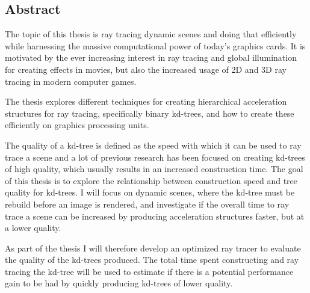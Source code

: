 
\begin{center}
\begin{minipage}{0.7\textwidth}
\vspace{6cm}

\section*{Abstract}

The topic of this thesis is ray tracing dynamic scenes and doing that
efficiently while harnessing the massive computational power of today's graphics
cards. It is motivated by the ever increasing interest in ray tracing and global
illumination for creating effects in movies, but also the increased usage of 2D
and 3D ray tracing in modern computer games.

The thesis explores different techniques for creating hierarchical acceleration
structures for ray tracing, specifically binary kd-trees, and how to create
these efficiently on graphics processing units.

The quality of a kd-tree is defined as the speed with which it can be used to
ray trace a scene and a lot of previous research has been focused on creating
kd-trees of high quality, which usually results in an increased construction
time. The goal of this thesis is to explore the relationship between
construction speed and tree quality for kd-trees. I will focus on dynamic
scenes, where the kd-tree must be rebuild before an image is rendered, and
investigate if the overall time to ray trace a scene can be increased by
producing acceleration structures faster, but at a lower quality.

As part of the thesis I will therefore develop an optimized ray tracer to
evaluate the quality of the kd-trees produced. The total time spent constructing
and ray tracing the kd-tree will be used to estimate if there is a potential
performance gain to be had by quickly producing kd-trees of lower quality.

\end{minipage}
\end{center}


